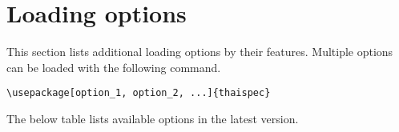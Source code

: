 \documentclass{article}
\begin{document}


\section{Loading options}
This section lists additional loading options by their features.
Multiple options can be loaded with the following command.
\begin{verbatim}
\usepackage[option_1, option_2, ...]{thaispec}
\end{verbatim}
The below table lists available options in the latest version.
\end{document}

